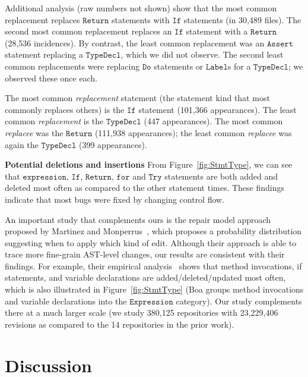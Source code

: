 \documentclass{sig-alternate-05-2015}
\begin{document}
Additional analysis (raw numbers not shown) show that the most common replacement
replaces $\mathtt{Return}$ statements with $\mathtt{If}$ statements (in 30,489 files). The
second most common replacement replaces an $\mathtt{If}$ statement with a $\mathtt{Return}$
(28,536 incidences). 
By contrast, the least common replacement was an $\mathtt{Assert}$
statement replacing a $\mathtt{TypeDecl}$, which we did not observe. 
The second least common replacements were replacing $\mathtt{Do}$ statements or $\mathtt{Label}$s for a $\mathtt{TypeDecl}$; we observed these once each.  

The most common
\emph{replacement} statement (the statement kind that most commonly replaces
others) is the $\mathtt{If}$ statement (101,366 appearances). The least
common \emph{replacement} is the $\mathtt{TypeDecl}$ (447
appearances).
The most common \emph{replacee} was the
$\mathtt{Return}$ (111,938 appearances); the least common
\emph{replacee} was again the $\mathtt{TypeDecl}$ (399 appearances).


\vspace{1ex}
\noindent \textbf{Potential deletions and insertions} From Figure~\ref{fig:StmtType}, we
can see that $\mathtt{expression}$, $\mathtt{If}$, $\mathtt{Return}$,
$\mathtt{for}$ and $\mathtt{Try}$ statements are both added and deleted
most often as compared to the other statement times. 
These findings indicate that most bugs were fixed by changing control
flow.

An important study that complements ours is the repair model approach
proposed by Martinez and Monperrus~\cite{Martinez:2015ez}, which proposes
a probability distribution suggesting when to apply which kind of edit. Although their
approach is able to trace more fine-grain AST-level changes, our results are
consistent with their findings. For example, their empirical
analysis~\cite{Martinez:2015ez} shows that method invocations, if statements,
and variable declarations are added/deleted/updated most often, which
is also illustrated in Figure~\ref{fig:StmtType} (Boa groups method invocations and
variable declarations into the $\mathtt{Expression}$ category).  Our study
complements there at a much larger scale (we study 380,125 repositories with 23,229,406
revisions as compared to the 14 repositories in the prior work). 

\section{Discussion}
\end{document}
